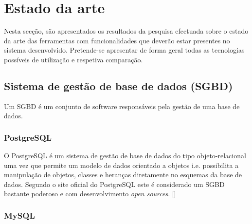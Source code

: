 \chapter{Estado da arte}



Nesta secção, são apresentados os resultados da pesquisa efectuada sobre o
estado da arte das ferramentas com funcionalidades que deverão estar presentes no sistema desenvolvido. Pretende-se apresentar de forma geral todas as tecnologias possíveis de utilização e respetiva comparação. 


\section{Sistema de gestão de base de dados (\ac{SGBD})}

Um \ac{SGBD} é um conjunto de software responsáveis pela gestão de uma base de dados.

\subsection{PostgreSQL}

O PostgreSQL é um sistema de gestão de base de dados do tipo objeto-relacional uma vez que permite um modelo de dados orientado a objetos i.e. possibilita a manipulação de objetos, classes e heranças diretamente no esquemas da base de dados. Segundo o site oficial do PostgreSQL este é considerado um \ac{SGBD} bastante poderoso e com desenvolvimento \textit{open sources}. []






\subsection{MySQL}



